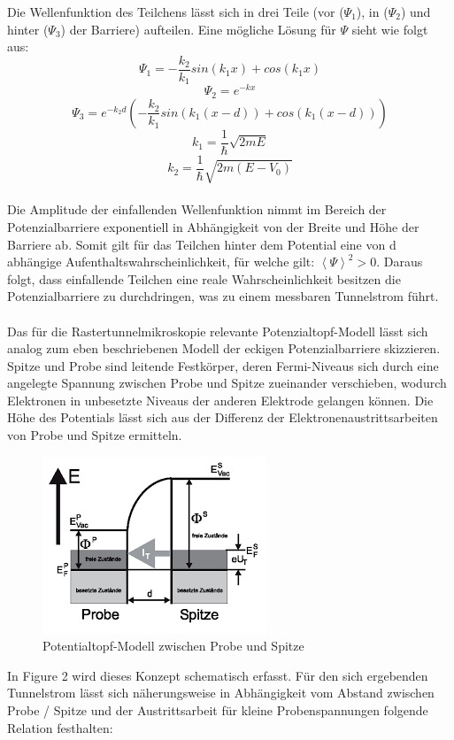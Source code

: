 \documentclass[10pt,a4paper]{article}
\begin{document}
	Die Wellenfunktion des Teilchens lässt sich in drei Teile (vor ($\Psi_{1}$), in ($\Psi_{2}$) und hinter ($\Psi_{3}$) der Barriere) aufteilen. Eine mögliche Lösung für $\Psi$ sieht wie folgt aus:\\
	$$\Psi_{1}= -\frac{k_{2}}{k_{1}}sin(k_{1}x) + cos(k_{1}x)$$ 
	$$\Psi_{2}= e^{-kx}$$
	$$\Psi_{3}= e^{-k_{2}d}(-\frac{k_{2}}{k_{1}}sin(k_{1}(x-d)) + cos(k_{1}(x-d)))$$
	$$ k_{1} = \frac{1}{\hbar}\sqrt{2mE} $$
	$$k_{2} = \frac{1}{\hbar}\sqrt{2m(E-V_{0})}$$
	\\Die Amplitude der einfallenden Wellenfunktion nimmt im Bereich der Potenzialbarriere exponentiell in Abhängigkeit von der Breite und Höhe der Barriere ab. Somit gilt für das Teilchen hinter dem Potential eine von d abhängige Aufenthaltswahrscheinlichkeit, für welche gilt: $\left \langle \Psi  \right \rangle^{2} > 0$. Daraus folgt, dass einfallende Teilchen eine reale Wahrscheinlichkeit besitzen die Potenzialbarriere zu durchdringen, was zu einem messbaren Tunnelstrom führt. \\ \\Das für die Rastertunnelmikroskopie relevante Potenzialtopf-Modell lässt sich analog zum eben beschriebenen Modell der eckigen Potenzialbarriere skizzieren. Spitze und Probe sind leitende Festkörper, deren Fermi-Niveaus sich durch eine angelegte Spannung zwischen Probe und Spitze zueinander verschieben, wodurch Elektronen in unbesetzte Niveaus der anderen Elektrode gelangen können. Die Höhe des Potentials lässt sich aus der Differenz der Elektronenaustrittsarbeiten von Probe und Spitze ermitteln.
	\begin{figure}[h]
		\includegraphics[scale = 1.2]{potentialtopf.png}
		\centering
		\caption{Potentialtopf-Modell zwischen Probe und Spitze}
		\label{diagramm_aufspaltung}
	\end{figure} 
	In Figure 2 wird dieses Konzept schematisch erfasst. Für den sich ergebenden Tunnelstrom lässt sich näherungsweise in Abhängigkeit vom Abstand zwischen Probe / Spitze und der Austrittsarbeit für kleine Probenspannungen folgende Relation festhalten: 
\end{document}

